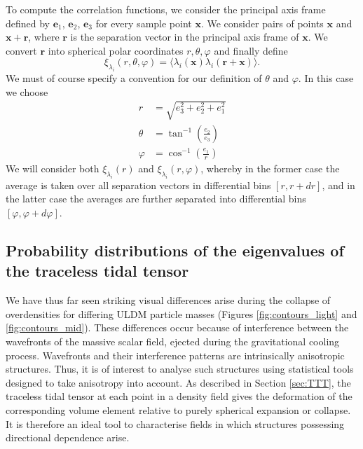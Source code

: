 \documentclass[a4paper,11pt]{article}
\begin{document}
To compute the correlation functions, we consider the principal axis frame defined by $\mathrm{\mathbf{e}}_1$, $\mathrm{\mathbf{e}}_2$, $\mathrm{\mathbf{e}}_3$ for every sample point $\mathrm{\mathbf{x}}$. We consider pairs of points $\mathrm{\mathbf{x}}$ and $\mathrm{\mathbf{x}}+\mathrm{\mathbf{r}}$, where $\mathrm{\mathbf{r}}$ is the separation vector in the principal axis frame of $\mathrm{\mathbf{x}}$. We convert $\mathrm{\mathbf{r}}$ into spherical polar coordinates $r, \theta, \varphi$ and finally define 
\begin{equation}
    \xi_{\lambda_i}(r, \theta, \varphi) = \langle\lambda_i(\mathrm{\mathbf{x}})\lambda_i(\mathrm{\mathbf{r+x}})\rangle.
\end{equation}
We must of course specify a convention for our definition of $\theta$ and $\varphi$. In this case we choose 
\begin{align}
    r &= \sqrt{e_3^2+e_2^2+e_1^2}\nonumber\\
    \theta &= \tan^{-1}\left(\frac{e_2}{e_3}\right)\nonumber\\
    \varphi &= \cos^{-1}\left(\frac{e_1}{r}\right)\nonumber
\end{align}
We will consider both $\xi_{\lambda_i}(r)$ and $\xi_{\lambda_i}(r,\varphi)$, whereby in the former case the average is taken over all separation vectors in differential bins $[r, r+dr]$, and in the latter case the averages are further separated into differential bins $[\varphi, \varphi + d\varphi]$.

\subsection{Probability distributions of the eigenvalues of the traceless tidal tensor}\label{sec:probs}

We have thus far seen striking visual differences arise during the collapse of overdensities for differing ULDM particle masses (Figures \ref{fig:contours_light} and \ref{fig:contours_mid}). These differences occur because of interference between the wavefronts of the massive scalar field, ejected during the gravitational cooling process. Wavefronts and their interference patterns are intrinsically anisotropic structures. Thus, it is of interest to analyse such structures using statistical tools designed to take anisotropy into account. As described in Section \ref{sec:TTT}, the traceless tidal tensor at each point in a density field gives the deformation of the corresponding volume element relative to purely spherical expansion or collapse. It is therefore an ideal tool to characterise fields in which structures possessing directional dependence arise. 
\end{document}
